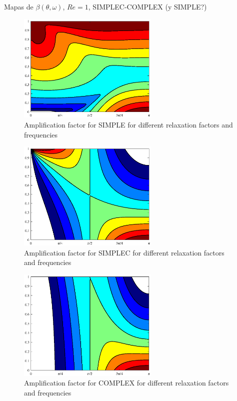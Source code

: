 \documentclass[final,3p,times,10pt,onecolumn]{myElsarticle}
\numberwithin{equation}{section}
\begin{document}
Mapas de $\beta(\theta,\omega)$, $Re=1$, SIMPLEC-COMPLEX (y SIMPLE?)
 
    \begin{figure}[H]
        \centering
        \includegraphics[width=0.6\textwidth]{fig/SIMPLE_map}
        \caption{Amplification factor for SIMPLE for different relaxation factors and frequencies}
        \label{fig:1c1}
    \end{figure}  
    \begin{figure}[H]
        \centering    
        \includegraphics[width=0.6\textwidth]{fig/SIMPLEC_map}
        \caption{Amplification factor for SIMPLEC for different relaxation factors and frequencies}
        \label{fig:1c1}
    \end{figure}  
    \begin{figure}[H]
        \centering           
        \includegraphics[width=0.6\textwidth]{fig/COMPLEX_map}
        \caption{Amplification factor for COMPLEX for different relaxation factors and frequencies}
        \label{fig:1c1}
    \end{figure}    
    
\end{document}
